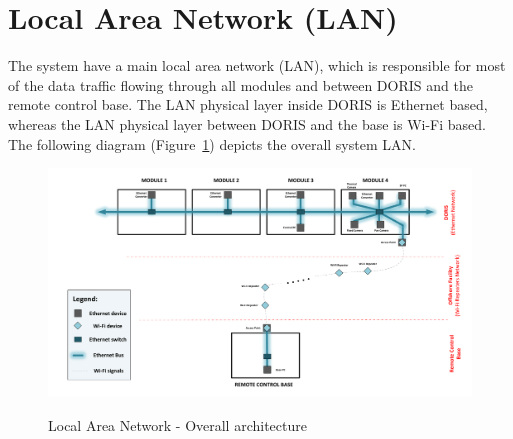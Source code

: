\section{Local Area Network (LAN)}
The system have a main local area network (LAN), which is responsible for most of the data traffic flowing through all modules and between DORIS and the remote control base. The LAN physical layer inside DORIS is Ethernet based, whereas the LAN physical layer between DORIS and the base is Wi-Fi based. The following diagram (Figure~\ref{FIG:LANDIAGRAM}) depicts the overall system LAN.
\begin{figure}
  \centering
  \includegraphics[angle=90,width=1\columnwidth]{figs/body01/FIGLANDIAGRAM.pdf}\\
  \caption[Local Area Network - Overall architecture]{Local Area Network - Overall architecture}
  \label{FIG:LANDIAGRAM}
\end{figure}

